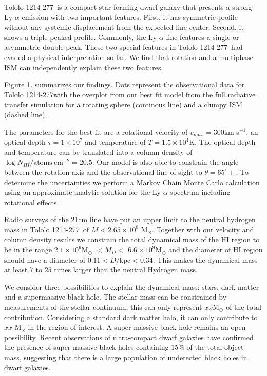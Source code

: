 \documentclass[a4paper, usenatbib, 12pt]{article}
\newcommand{\tol}{Tololo 1214-277}
\newcommand{\kms}{km s$^{-1}$}
\begin{document}
{\tol\ is a compact star forming dwarf galaxy that presents a
strong Ly-$\alpha$ emission \cite{Thuan97} with two important
features. 
First, it has symmetric profile  without any systemic displacement
from the expected line-center. 
Second, it shows a triple peaked profile. 
Commonly, the Ly-$\alpha$ line features a single or asymmetric double peak. 
These two special features in \tol\ had evaded a physical
interpretation so far.
We find that rotation and a multiphase ISM can independently explain
these two features.  


Figure 1. summarizes our findings.
Dots represent the observational data for \tol with the
overplot from our best fit model from the full radiative transfer
simulation for a rotating sphere (continous line) and a clumpy ISM
(dashed line).

The parameters for the best fit are a rotational velocity of
$v_{max}=300$\kms, an optical depth $\tau=1\times10^7$ and temperature
of $T=1.5\times 10^{4}$K.
The optical depth and temperature can be translated into a column
density of $\log N_{HI} / \mathrm{atoms\ cm}^{-2} =
  20.5$.   
Our model is also able to constrain the angle
between the rotation axis and the observational line-of-sight to
$\theta=65^{\circ}\pm$. 
To determine the uncertainties we perform a Markov Chain Monte
Carlo calculation using an approximate analytic solution for the
Ly-$\alpha$ spectrum including rotational effects.


Radio surveys of the 21cm line have put an upper limit to the neutral
hydrogen mass in \tol\ of $M<2.65\times 10^{8}$ M$_{\odot}$. 
Together with our velocity and column density results we constrain the
total dynamical mass of the HI region to be in the range $2.1\times
10^{9}$M$_{\odot}$ $<M_D<$  $6.6\times 10^{9}$M$_{\odot}$ and the
diameter of HI region should have a diameter of $0.11 <
D/\mathrm{kpc}<0.34$.  
This makes the dynamical mass  at least $7$ to $25$ times larger than
the neutral Hydrogen mass.  

We consider three possibilities to explain the dynamical 
mass: stars, dark matter and a supermassive black hole. 
The stellar mass can be constrained by measurements of the 
stellar continuum, this can only represent $xx$M$_{\odot}$ of the total
contribution. 
Considering a standard dark matter halo, it can only contribute to
$xx$ M$_{\odot}$ in the region of interest. 
A super massive black hole remains an open possibility. 
Recent observations of ultra-compact dwarf galaxies
\cite{Seth2014} have confirmed the presence of super-massive black
holes containing $15\%$ of the total object mass, suggesting that
there is a large population of undetected black holes in dwarf
galaxies.  

}
\end{document}
